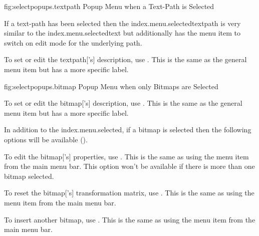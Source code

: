 

\FloatFig
  {fig:selectpopups.textpath}
  {}
  {Popup Menu when a Text-Path is Selected}


If a text-path has been selected then the
\gls{index.menu.selectedtextpath} is very similar to the
\gls{index.menu.selectedtext} but additionally has the
 menu item to switch on edit mode for the
underlying path.


To set or edit the \gls{textpath}['s] description, use
. This is the same as
the general  menu item but has a more specific label.



\FloatFig
  {fig:selectpopups.bitmap}
  {}
  {Popup Menu when only Bitmaps are Selected}


To set or edit the \gls{bitmap}['s] description, use
. This is the same as
the general  menu item but has a more specific label.

In addition to the \gls{index.menu.selected},
if a \gls{bitmap} is selected then the following options will be available
().


To edit the \gls{bitmap}['s] properties, use
. This is the same as using
the  menu item from the main menu bar.
This option won't be available if there is more than one
\gls{bitmap} selected.


To reset the \gls{bitmap}['s]
transformation matrix, use . This is the
same as using the  menu item from the main menu
bar.


To insert another \gls{bitmap}, use . This is the
same as using the  menu item from the main menu
bar.

